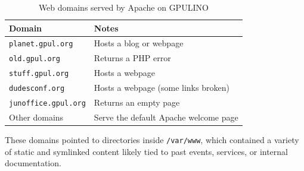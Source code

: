 \begin{table}[H]
  \centering
  \caption{Web domains served by Apache on GPULINO}
  \label{tab:gpulino_apache_domains}
  \begin{tabular}{ll}
    \rowcolor{udcpink!25}
    \textbf{Domain} & \textbf{Notes} \\
    \hline
    \texttt{planet.gpul.org} & Hosts a blog or webpage \\
    \texttt{old.gpul.org} & Returns a PHP error \\
    \texttt{stuff.gpul.org} & Hosts a webpage \\
    \texttt{dudesconf.org} & Hosts a webpage (some links broken) \\
    \texttt{junoffice.gpul.org} & Returns an empty page \\
    Other domains & Serve the default Apache welcome page \\
  \end{tabular}
\end{table}

These domains pointed to directories inside \texttt{/var/www}, which contained a variety of static and symlinked content likely tied to past events, services, or internal documentation.

